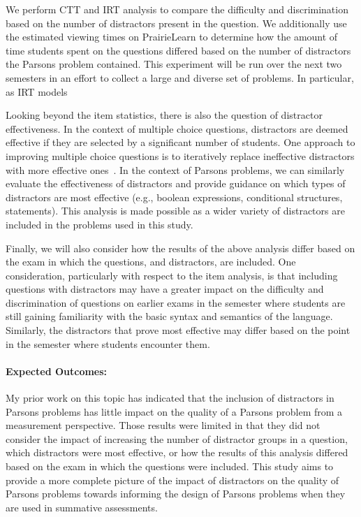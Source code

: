 \documentclass[authorversion,nonacm]{acmart}
\begin{document}
We perform CTT and IRT analysis to compare the difficulty and discrimination
based on the number of distractors present in the question. We additionally use
the estimated viewing times on PrairieLearn to determine how the amount of time
students spent on the questions differed based on the number of distractors the
Parsons problem contained. This experiment will be run over the next two
semesters in an effort to collect a large and diverse set of problems. In particular,
as IRT models 

Looking beyond the item statistics, there is also the question of distractor
effectiveness. In the context of multiple choice questions, distractors are
deemed effective if they are selected by a significant number of students. One
approach to improving multiple choice questions is to iteratively replace
ineffective distractors with more effective ones~\cite{XXX}. In the context of
Parsons problems, we can similarly evaluate the effectiveness of distractors 
and provide guidance on which types of distractors are most effective (e.g.,
boolean expressions, conditional structures, statements). This analysis is 
made possible as a wider variety of distractors are included in the problems
used in this study.

Finally, we will also consider how the results of the above analysis differ
based on the exam in which the questions, and distractors, are included. One 
consideration, particularly with respect to the item analysis, is that including
questions with distractors may have a greater impact on the difficulty and
discrimination of questions on earlier exams in the semester where students
are still gaining familiarity with the basic syntax and semantics of the
language. Similarly, the distractors that prove most effective may differ
based on the point in the semester where students encounter them.

\paragraph{Expected Outcomes:} My prior work on this topic has indicated that 
the inclusion of distractors in Parsons problems has little impact on the
quality of a Parsons problem from a measurement perspective. Those results
were limited in that they did not consider the impact of increasing the number
of distractor groups in a question, which distractors were most effective, or
how the results of this analysis differed based on the exam in which the
questions were included. This study aims to provide a more complete picture of
the impact of distractors on the quality of Parsons problems towards informing
the design of Parsons problems when they are used in summative assessments.
\end{document}
